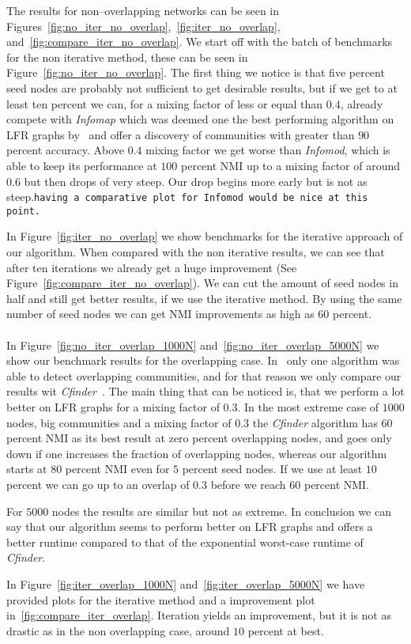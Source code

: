 The results for non--overlapping networks can be seen in Figures~\ref{fig:no_iter_no_overlap},~\ref{fig:iter_no_overlap}, and~\ref{fig:compare_iter_no_overlap}. We start off with the batch of benchmarks for the non iterative method, these can be seen in Figure~\ref{fig:no_iter_no_overlap}. The first thing we notice is that five percent seed nodes are probably not sufficient to get desirable results, but if we get to at least ten percent we can, for a mixing factor of less or equal than $0.4$, already compete with \textit{Infomap} which was deemed one the best performing algorithm on LFR graphs by~\cite{LF09} and offer a discovery of communities with greater than $90$ percent accuracy. Above $0.4$ mixing factor we get worse than \textit{Infomod}, which is able to keep its performance at $100$ percent NMI up to a mixing factor of around $0.6$ but then drops of very steep. Our drop begins more early but is not as steep.\texttt{having a comparative plot for Infomod would be nice at this point.}

In Figure~\ref{fig:iter_no_overlap} we show benchmarks for the iterative approach of our algorithm. When compared with the non iterative results, we can see that after ten iterations we already get a huge improvement (See Figure~\ref{fig:compare_iter_no_overlap}). We can cut the amount of seed nodes in half and still get better results, if we use the iterative method. By using the same number of seed nodes we can get NMI improvements as high as $60$ percent.\\ \\
In Figure~\ref{fig:no_iter_overlap_1000N} and~\ref{fig:no_iter_overlap_5000N} we show our benchmark results for the overlapping case. In~\cite{LF09} only one algorithm was able to detect overlapping communities, and for that reason we only compare our results wit \textit{Cfinder}~\cite{PDFV05}. The main thing that can be noticed is, that we perform a lot better on LFR graphs for a mixing factor of $0.3$. In the most extreme case of $1000$ nodes, big communities and a mixing factor of $0.3$ the \textit{Cfinder} algorithm has $60$ percent NMI as its best result at zero percent overlapping nodes, and goes only down if one increases the fraction of overlapping nodes, whereas our algorithm starts at $80$ percent NMI even for $5$ percent seed nodes. If we use at least $10$ percent we can go up to an overlap of $0.3$ before we reach $60$ percent NMI.

For $5000$ nodes the results are similar but not as extreme. In conclusion we can say that our algorithm seems to perform better on LFR graphs and offers a better runtime compared to that of the exponential worst-case runtime of \textit{Cfinder}.

In Figure~\ref{fig:iter_overlap_1000N} and~\ref{fig:iter_overlap_5000N} we have provided plots for the iterative method and a improvement plot in~\ref{fig:compare_iter_overlap}. Iteration yields an improvement, but it is not as drastic as in the non overlapping case, around $10$ percent at best.
